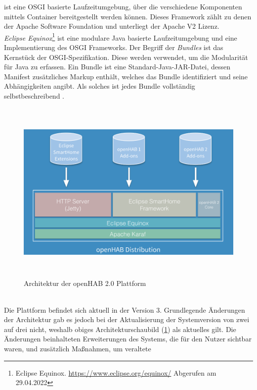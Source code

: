     ist eine \acs{OSGI} basierte Laufzeitumgebung, über die verschiedene Komponenten mittels Container 
    bereitgestellt werden können. Dieses Framework zählt zu denen der Apache Software Foundation und unterliegt der Apache V2 Lizenz.
    \\
    \linebreak
    \textit{Eclipse Equinox}\footnote{Eclipse Equinox. \url{https://www.eclipse.org/equinox/} Abgerufen am 29.04.2022} ist eine modulare 
    Java basierte Laufzeitumgebung und eine Implementierung des \acs{OSGI} Frameworks. Der Begriff der \textit{Bundles} ist das 
    Kernstück der \acs{OSGI}-Spezifikation. Diese werden verwendet, um die Modularität für Java zu erfassen. Ein Bundle ist 
    eine Standard-Java-JAR-Datei, dessen Manifest zusätzliches Markup enthält, welches das Bundle identifiziert und seine Abhängigkeiten 
    angibt. Als solches ist jedes Bundle vollständig selbstbeschreibend \cite{openHAB-article}. 
    \begin{figure}[hbt!]
        \centering
        \includegraphics[width=15cm,height=9cm,keepaspectratio]{images/openhab-2-architecture.png}
        \caption{Architektur der openHAB 2.0 Plattform \cite{kaikreutzer2016}}
        \label{fig:architectureopenHAB2}
    \end{figure}
    \\
    Die Plattform befindet sich aktuell in der Version 3. Grundlegende Änderungen der Architektur gab es jedoch bei der Aktualisierung 
    der Systemversion von zwei auf drei nicht, weshalb obiges Architekturschaubild (\ref{fig:architectureopenHAB2}) als aktuelles gilt. 
    Die Änderungen beinhalteten Erweiterungen des Systems, die für den Nutzer sichtbar waren, und zusätzlich Maßnahmen, um veraltete 
